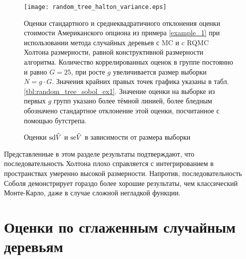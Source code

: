 
\begin{figure}[h]
    \begin{center}
    \texttt{[image: random\_tree\_halton\_variance.eps]}\end{center}
    \caption{Оценки $\mathrm{sd}\hat{V}$ и $\mathrm{se}\hat{V}$ в зависимости от размера выборки}
    \label{fig:random_tree_halton_variance}
    \linespread{0.7}\footnotesize{
        Оценки стандартного и среднеквадратичного отклонения оценки стоимости Американского опциона из примера \ref{example_1} при использовании метода случайных деревьев с MC и c RQMC Холтона размерности, равной конструктивной размерности алгоритма. Количество коррелированных оценок в группе постоянно и равно $G=25$, при росте $g$ увеличивается размер выборки $N=g\cdot G$. Значения крайних правых точек графика указаны в табл.\,\ref{tbl:random_tree_sobol_ex1}. Значение оценки на выборке из первых $g$ групп указано более тёмной линией, более бледным обозначено стандартное отклонение этой оценки, посчитанное с помощью бутстрепа.}
\end{figure}



Представленные в этом разделе результаты подтверждают, что последовательность Холтона плохо справляется с интегрированием в пространствах умеренно высокой размерности. Напротив, последовательность Соболя демонстрирует гораздо более хорошие результаты, чем классический Монте-Карло, даже в случае сложной негладкой функции.


\section{Оценки по сглаженным случайным деревьям} %
\label{sec:results:pruned_trees}

